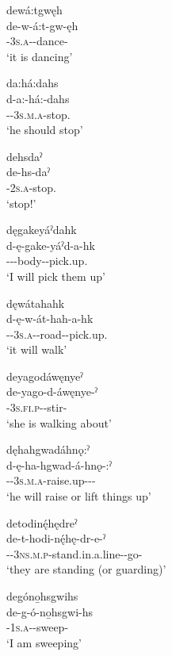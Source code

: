 \ex dewá:tgwęh\\
\gll de-w-á:t-gw-ęh\\
{\dualic}-\textsc{3s.a}-{\semireflexive}-dance-{\stative}\\
\glt `it is dancing'

\ex da:há:dahs\\
\gll d-a:-há:-dahs\\
{\dualic}-{\indefinite}-\textsc{3s.m.a}-stop.{\noaspect}\\
\glt `he should stop'

\ex dehsdaˀ\\
\gll de-hs-daˀ\\
{\dualic}-\textsc{2s.a}-stop.{\noaspect}\\
\glt `stop!'

\ex dęgakeyáˀdahk\\
\gll d-ę-gake-yáˀd-a-hk\\
{\dualic}-{\future}--body-{\joinerA}-pick.up.{\zeropunctual}\\
\glt `I will pick them up'

\ex dęwátahahk\\
\gll d-ę-w-át-hah-a-hk\\
{\dualic}-{\future}-\textsc{3s.a}-{\semireflexive}-road-{\joinerA}-pick.up.{\zeropunctual}\\
\glt `it will walk'

\ex deyagodáwęnyeˀ\\
\gll de-yago-d-áwęnye-ˀ\\
{\dualic}-\textsc{3s.fi.p}-{\semireflexive}-stir-{\stative}\\
\glt `she is walking about'

\ex dęhahgwadáhnǫ:ˀ\\
\gll d-ę-ha-hgwad-á-hnǫ-:ˀ\\
{\dualic}-{\future}-\textsc{3s.m.a}-raise.up-{\joinerA}-{\distributive}-{\punctual}\\
\glt `he will raise or lift things up'

\ex detodinę́hędreˀ\\
\gll de-t-hodi-nę́hę-dr-e-ˀ\\
{\dualic}-{\cislocative}-\textsc{3ns.m.p}-stand.in.a.line-{\dislocative}-go-{\stative}\\
\glt `they are standing (or guarding)'

\ex degóno̱hsgwihs\\
\gll de-g-ó-no̱hsgwi-hs\\
{\dualic}-\textsc{1s.a}-{\semireflexive}-sweep-{\habitual}\\
\glt `I am sweeping'

